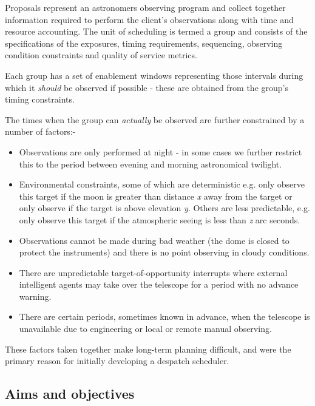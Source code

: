 \documentclass[12pt,a4paper]{article}
\begin{document}
Proposals represent an astronomers observing program and collect together information required to perform the client's observations along with time and resource accounting. The unit of scheduling is termed a group and consists of the specifications of the exposures, timing requirements, sequencing, observing condition constraints and quality of service metrics. 

Each group has a set of enablement windows representing those intervals during which it \emph{should} be observed if possible - these are obtained from the group's timing constraints. 

The times when the group can \emph{actually} be observed are further constrained by a number of factors:-
\begin{itemize}
\item Observations are only performed at night - in some cases we further restrict this to the period between evening and morning astronomical twilight.

\item Environmental constraints, some of which are deterministic e.g. only observe this target if the moon is greater than distance \emph{x} away from the target or only observe if the target is above elevation \emph{y}. Others are less predictable, e.g. only observe this target if the atmospheric seeing is less than \emph{z} arc seconds. 

\item Observations cannot be made during bad weather (the dome is closed to protect the instruments) and there is no point observing in cloudy conditions.

\item There are unpredictable target-of-opportunity interrupts where external intelligent agents \citep{guidorzi06automatic, tsapras09robonet} may take over the telescope for a period with no advance warning.

\item There are certain periods, sometimes known in advance, when the telescope is unavailable due to engineering or local or remote manual observing.

\end{itemize}
 
These factors taken together make long-term planning difficult, and were the primary reason for initially developing a despatch scheduler.

\subsection{Aims and objectives}
\end{document}
